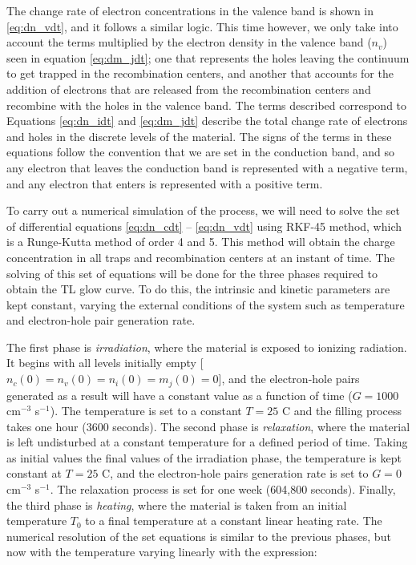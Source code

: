 \vspace{10pt}
The change rate of electron concentrations in the valence band is shown in \ref{eq:dn_vdt}, and it follows a similar logic. This time however, we only take into account the terms multiplied by the electron density in the valence band ($n_v$) seen in equation \ref{eq:dm_jdt}; one that represents the holes leaving the continuum to get trapped in the recombination centers, and another that accounts for the addition of electrons that are released from the recombination centers and recombine with the holes in the valence band. The terms described correspond to Equations \ref{eq:dn_idt} and \ref{eq:dm_jdt} describe the total change rate of electrons and holes in the discrete levels of the material. The signs of the terms in these equations follow the convention that we are set in the conduction band, and so any electron that leaves the conduction band is represented with a negative term, and any electron that enters is represented with a positive term.

\vspace{10pt}

To carry out a numerical simulation of the process, we will need to solve the set of differential equations \ref{eq:dn_cdt} -- \ref{eq:dn_vdt} using RKF-45 method, which is a Runge-Kutta method of order 4 and 5. This method will obtain the charge concentration in all traps and recombination centers at an instant of time. The solving of this set of equations will be done for the three phases required to obtain the TL glow curve. To do this, the intrinsic and kinetic parameters are kept constant, varying the external conditions of the system such as temperature and electron-hole pair generation rate. 

\vspace{10pt}
The first phase is \textit{irradiation}, where the material is exposed to ionizing radiation. It begins with all levels initially empty [$n_c(0) = n_v(0) = n_i(0) = m_j(0) = 0$], and the electron-hole pairs generated as a result will have a constant value as a function of time ($G = 1000$ cm$^{-3}$ s$^{-1}$). The temperature is set to a constant $T = 25$ \textdegree C and the filling process takes one hour (3600 seconds). The second phase is \textit{relaxation}, where the material is left undisturbed at a constant temperature for a defined period of time. Taking as initial values the final values of the irradiation phase, the temperature is kept constant at $T = 25$ \textdegree C, and the electron-hole pairs generation rate is set to $G = 0$ cm$^{-3}$ s$^{-1}$. The relaxation process is set for one week (604,800 seconds). Finally, the third phase is \textit{heating}, where the material is taken from an initial temperature $T_0$ to a final temperature at a constant linear heating rate. The numerical resolution of the set equations is similar to the previous phases, but now with the temperature varying linearly with the expression:

